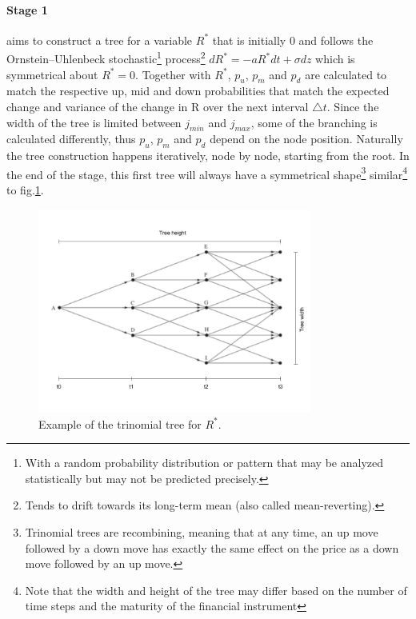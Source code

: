 \paragraph{Stage 1}
aims to construct a tree for a variable $R^*$ that is initially 0 and follows the Ornstein–Uhlenbeck stochastic\footnote{With a random probability distribution or pattern that may be analyzed statistically but may not be predicted precisely.} process\footnote{Tends to drift towards its long-term mean (also called mean-reverting).} $dR^*=-aR^*dt + \sigma dz$ which is symmetrical about $R^*=0$\cite[pg.698-699]{ofod}. Together with $R^*$, $p_u$, $p_m$ and $p_d$ are calculated to match the respective up, mid and down probabilities that match the expected change and variance of the change in R over the next interval $\triangle t$. Since the width of the tree is limited between $j_{min}$ and $j_{max}$, some of the branching is calculated differently, thus $p_u$, $p_m$ and $p_d$ depend on the node position. Naturally the tree construction happens iteratively, node by node, starting from the root. In the end of the stage, this first tree will always have a symmetrical shape\footnote{Trinomial trees are recombining, meaning that at any time, an up move followed by a down move has exactly the same effect on the price as a down move followed by an up move.} similar\footnote{Note that the width and height of the tree may differ based on the number of time steps and the maturity of the financial instrument} to fig.\ref{fig:treeconststage1}. 
\begin{figure}[H]
	\centering
	\includegraphics[width=0.8\textwidth]{img/treeconststage1wh.jpg}
	\caption{Example of the trinomial tree for $R^*$.}
	\label{fig:treeconststage1}
\end{figure}

